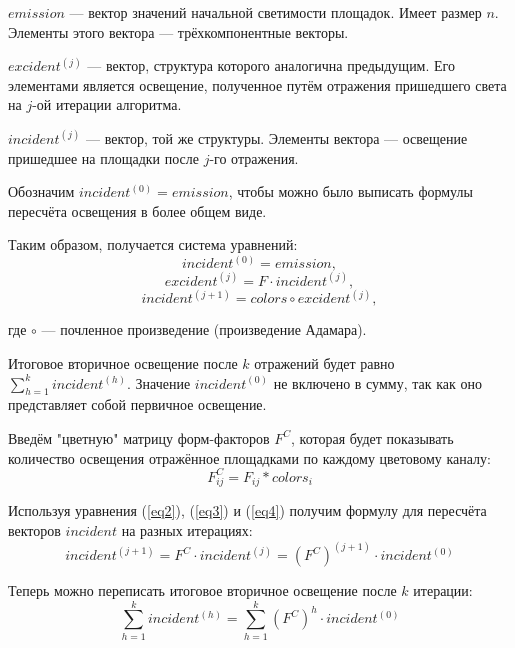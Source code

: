 \documentclass[12pt,fleqn]{article}
\begin{document}
$emission$ --- вектор значений начальной светимости площадок. Имеет размер $n$. Элементы этого вектора --- трёхкомпонентные векторы.

$excident^{(j)}$ --- вектор, структура которого аналогична предыдущим. Его элементами является освещение, полученное путём отражения пришедшего света на $j$-ой итерации алгоритма.

$incident^{(j)}$ --- вектор, той же структуры. Элементы вектора --- освещение пришедшее на площадки после $j$-го отражения.

Обозначим $incident^{(0)} = emission$, чтобы можно было выписать формулы пересчёта освещения в более общем виде.

Таким образом, получается система уравнений:
\begin{equation}
\label{eq1}
incident^{(0)} = emission,
\end{equation}
\begin{equation}
\label{eq2}
excident^{(j)} = F \cdot incident^{(j)},
\end{equation}
\begin{equation}
\label{eq3}
incident^{(j + 1)} = colors \circ excident^{(j)},
\end{equation}

где $\circ$ --- почленное произведение (произведение Адамара).

Итоговое вторичное освещение после $k$ отражений будет равно
$\sum\limits_{h = 1}^k incident^{(h)}$.
Значение $incident^{(0)}$ не включено в сумму, так как оно представляет собой первичное освещение.

Введём "цветную" матрицу форм-факторов $F^C$, которая будет показывать количество освещения отражённое площадками по каждому цветовому каналу:
\begin{equation}
\label{eq4}
F^C_{ij} = F_{ij} * colors_i
\end{equation}

Используя уравнения (\ref{eq2}), (\ref{eq3}) и (\ref{eq4}) получим формулу для пересчёта векторов $incident$ на разных итерациях:
\begin{equation}
\label{eq5}
incident^{(j + 1)} = F^C \cdot incident^{(j)} = \left( F^C \right) ^ {(j + 1)} \cdot incident^{(0)}
\end{equation}

Теперь можно переписать итоговое вторичное освещение после $k$ итерации:
\begin{equation}
\label{eq6}
\sum\limits_{h = 1}^k incident^{(h)} = \sum\limits_{h = 1}^k \left(F^C\right)^h \cdot incident^{(0)}
\end{equation}
\end{document}
